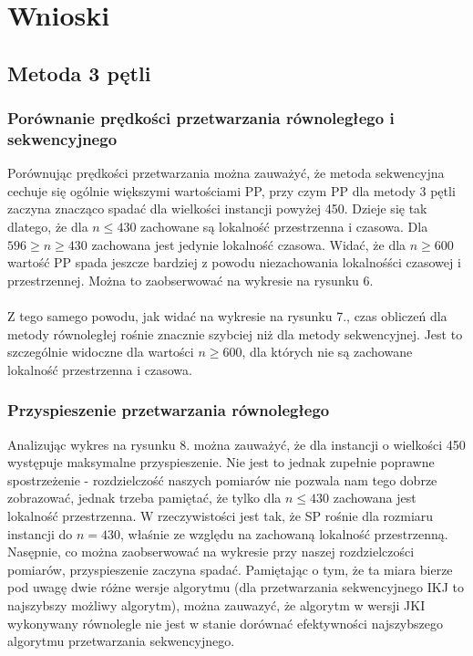 \documentclass[10pt,a4paper]{article}
\begin{document}
\newpage

\section{Wnioski}
\subsection{Metoda 3 pętli}
\subsubsection*{Porównanie prędkości przetwarzania równoległego i sekwencyjnego}
Porównując prędkości przetwarzania można zauważyć, że metoda sekwencyjna cechuje się ogólnie
większymi wartościami PP, przy czym PP dla metody 3 pętli zaczyna znacząco spadać dla wielkości instancji
powyżej 450. Dzieje się tak dlatego, że dla $n\leq430$ zachowane są lokalność przestrzenna
i czasowa. Dla $596 \geq n \geq 430$ zachowana jest jedynie lokalność czasowa. Widać, że dla 
$n\geq600$ wartość PP spada jeszcze bardziej z powodu niezachowania lokalnośści czasowej 
i przestrzennej. Można to zaobserwować na wykresie na rysunku 6.\\
\\
Z tego samego powodu, jak widać na wykresie na rysunku 7., czas obliczeń dla metody równoległej
rośnie znacznie szybciej niż dla metody sekwencyjnej. Jest to szczególnie widoczne dla wartości
$n\geq600$, dla których nie są zachowane lokalność przestrzenna i czasowa.

\subsubsection*{Przyspieszenie przetwarzania równoległego}
Analizując wykres na rysunku 8. można zauważyć, że dla instancji o wielkości 450 występuje maksymalne
przyspieszenie. Nie jest to jednak zupełnie poprawne spostrzeżenie - rozdzielczość naszych pomiarów
nie pozwala nam tego dobrze zobrazować, jednak trzeba pamiętać, że tylko dla $n\leq430$ zachowana jest
lokalność przestrzenna. W rzeczywistości jest tak, że SP rośnie dla rozmiaru instancji do $n=430$,
właśnie ze względu na zachowaną lokalność przestrzenną. Nasępnie, co można zaobserwować na wykresie
przy naszej rozdzielczości pomiarów, przyspieszenie zaczyna spadać. Pamiętając o tym, że ta miara
bierze pod uwagę dwie różne wersje algorytmu (dla przetwarzania sekwencyjnego IKJ to najszybszy 
możliwy algorytm), można zauwazyć, że algorytm w wersji JKI wykonywany równolegle nie jest w 
stanie dorównać efektywności najszybszego algorytmu przetwarzania sekwencyjnego.
\end{document}
